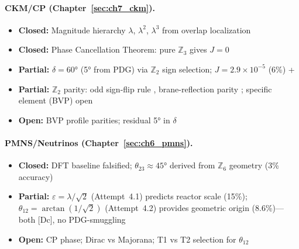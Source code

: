 \paragraph{CKM/CP (Chapter~\ref{sec:ch7_ckm}).}
\begin{itemize}[nosep]
    \item \textcolor{OliveGreen}{\textbf{Closed:}} Magnitude hierarchy $\lambda$, $\lambda^2$, $\lambda^3$ from overlap localization \tagDc{}
    \item \textcolor{OliveGreen}{\textbf{Closed:}} Phase Cancellation Theorem: pure $\mathbb{Z}_3$ gives $J = 0$ \tagDc{}
    \item \textcolor{YellowOrange}{\textbf{Partial:}} $\delta = 60°$ (5° from PDG) via $\mathbb{Z}_2$ sign selection; $J = 2.9 \times 10^{-5}$ (6\%) \tagDc{}+\tagI{}
    \item \textcolor{YellowOrange}{\textbf{Partial:}} $\mathbb{Z}_2$ parity: odd sign-flip rule \tagDc{}, brane-reflection parity \tagP{}; specific element (BVP) open
    \item \textcolor{BrickRed}{\textbf{Open:}} BVP profile parities; residual 5° in $\delta$
\end{itemize}

\paragraph{PMNS/Neutrinos (Chapter~\ref{sec:ch6_pmns}).}
\begin{itemize}[nosep]
    \item \textcolor{OliveGreen}{\textbf{Closed:}} DFT baseline falsified; $\theta_{23} \approx 45°$ derived from $\mathbb{Z}_6$ geometry (3\% accuracy) \tagDc{}
    \item \textcolor{YellowOrange}{\textbf{Partial:}} $\varepsilon = \lambda/\sqrt{2}$ (Attempt~4.1) predicts reactor scale (15\%); $\theta_{12} = \arctan(1/\sqrt{2})$ (Attempt~4.2) provides geometric origin (8.6\%)---both [Dc], no PDG-smuggling
    \item \textcolor{BrickRed}{\textbf{Open:}} CP phase; Dirac vs Majorana; T1 vs T2 selection for $\theta_{12}$
\end{itemize}

